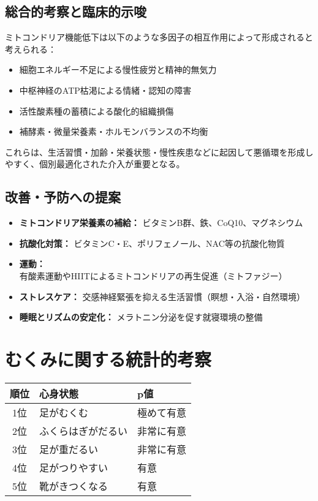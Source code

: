 \documentclass[a4paper,12pt]{article}
\begin{document}
\subsection*{総合的考察と臨床的示唆}

ミトコンドリア機能低下は以下のような多因子の相互作用によって形成されると考えられる：

\begin{itemize}
  \item 細胞エネルギー不足による慢性疲労と精神的無気力
  \item 中枢神経のATP枯渇による情緒・認知の障害
  \item 活性酸素種の蓄積による酸化的組織損傷
  \item 補酵素・微量栄養素・ホルモンバランスの不均衡
\end{itemize}

これらは、生活習慣・加齢・栄養状態・慢性疾患などに起因して悪循環を形成しやすく、個別最適化された介入が重要となる。

\subsection*{改善・予防への提案}

\begin{itemize}
  \item \textbf{ミトコンドリア栄養素の補給：} ビタミンB群、鉄、CoQ10、マグネシウム
  \item \textbf{抗酸化対策：} ビタミンC・E、ポリフェノール、NAC等の抗酸化物質
  \item \textbf{運動：} 有酸素運動やHIITによるミトコンドリアの再生促進（ミトファジー）
  \item \textbf{ストレスケア：} 交感神経緊張を抑える生活習慣（瞑想・入浴・自然環境）
  \item \textbf{睡眠とリズムの安定化：} メラトニン分泌を促す就寝環境の整備
\end{itemize}



\section{むくみに関する統計的考察}
\begin{table}[H]
\centering
\begin{tabular}{|c|l|l|}
\hline
順位 & 心身状態 & p値 \\
\hline
1位 & 足がむくむ & 極めて有意 \\
2位 & ふくらはぎがだるい & 非常に有意 \\
3位 & 足が重だるい & 非常に有意 \\
4位 & 足がつりやすい & 有意 \\
5位 & 靴がきつくなる & 有意 \\
\hline
\end{tabular}
\end{table}
\end{document}
